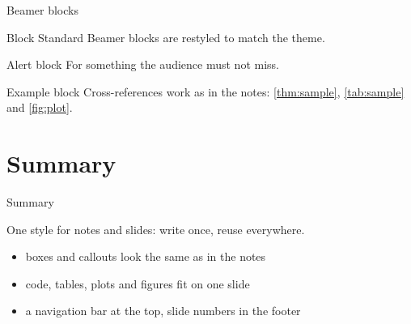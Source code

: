 \documentclass[aspectratio=169, 9pt, t, notheorems]{beamer}
\begin{document}
\begin{frame}{Beamer blocks}
  \begin{block}{Block}
    Standard Beamer blocks are restyled to match the theme.
  \end{block}
  \begin{alertblock}{Alert block}
    For something the audience must not miss.
  \end{alertblock}
  \begin{exampleblock}{Example block}
    Cross-references work as in the notes: \cref{thm:sample}, \cref{tab:sample}
    and \cref{fig:plot}.
  \end{exampleblock}
\end{frame}

\section{Summary}

\begin{frame}{Summary}
  \begin{summary}
    One style for notes and slides: write once, reuse everywhere.
  \end{summary}
  \begin{itemize}
    \item boxes and callouts look the same as in the notes
    \item code, tables, plots and figures fit on one slide
    \item a navigation bar at the top, slide numbers in the footer
  \end{itemize}
\end{frame}

\closingframe   %
\end{document}
